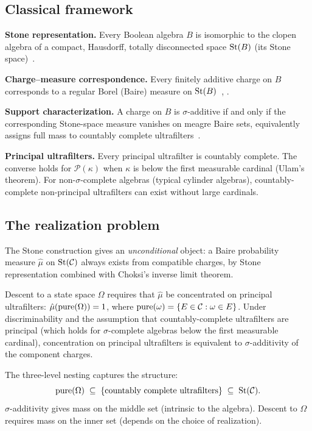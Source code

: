 \subsection{Classical framework}

\textbf{Stone representation.}  Every Boolean algebra $B$ is
isomorphic to the clopen algebra of a compact, Hausdorff, totally
disconnected space $\mathrm{St}(B)$ (its Stone
space)~\cite{Johnstone1982}.

\textbf{Charge--measure correspondence.}  Every finitely additive
charge on $B$ corresponds to a regular Borel (Baire) measure on
$\mathrm{St}(B)$~\cite[\S326]{Fremlin2003}, \cite[\S53]{Halmos1950}.

\textbf{Support characterization.}  A charge on $B$ is
$\sigma$-additive if and only if the corresponding Stone-space
measure vanishes on meagre Baire sets, equivalently assigns full
mass to countably complete
ultrafilters~\cite[Theorem~10.5.3]{RaoRao1983}.

\textbf{Principal ultrafilters.}  Every principal ultrafilter is
countably complete.  The converse holds for $\mathcal{P}(\kappa)$
when $\kappa$ is below the first measurable cardinal (Ulam's
theorem).  For non-$\sigma$-complete algebras (typical cylinder
algebras), countably-complete non-principal ultrafilters can exist
without large cardinals.

\subsection{The realization problem}

The Stone construction gives an \emph{unconditional} object: a Baire
probability measure $\hat{\mu}$ on $\mathrm{St}(\mathcal{C})$ always exists
from compatible charges, by Stone representation combined with
Choksi's inverse limit theorem.

Descent to a state space $\Omega$ requires that $\hat{\mu}$ be
concentrated on principal ultrafilters:
$\hat{\mu}(\mathrm{pure}(\Omega)) = 1$, where
$\mathrm{pure}(\omega) = \{E \in \mathcal{C} : \omega \in E\}$.  Under
discriminability and the assumption that countably-complete
ultrafilters are principal (which holds for $\sigma$-complete
algebras below the first measurable cardinal), concentration on
principal ultrafilters is equivalent to $\sigma$-additivity of the
component charges.

The three-level nesting captures the structure:
\[
  \mathrm{pure}(\Omega) \;\subseteq\;
  \{\text{countably complete ultrafilters}\} \;\subseteq\;
  \mathrm{St}(\mathcal{C}).
\]
$\sigma$-additivity gives mass on the middle set (intrinsic to the
algebra).  Descent to $\Omega$ requires mass on the inner set
(depends on the choice of realization).

